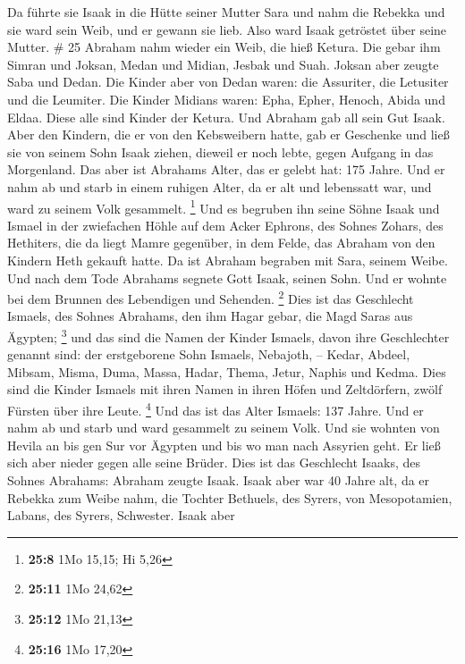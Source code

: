  Da führte sie Isaak in die Hütte seiner Mutter Sara und
nahm die Rebekka und sie ward sein Weib, und er gewann sie lieb. Also
ward Isaak getröstet über seine Mutter. \# 25  Abraham nahm
wieder ein Weib, die hieß Ketura.  Die gebar ihm Simran und
Joksan, Medan und Midian, Jesbak und Suah.  Joksan aber
zeugte Saba und Dedan. Die Kinder aber von Dedan waren: die Assuriter,
die Letusiter und die Leumiter.  Die Kinder Midians waren:
Epha, Epher, Henoch, Abida und Eldaa. Diese alle sind Kinder der Ketura.
 Und Abraham gab all sein Gut Isaak.  Aber den
Kindern, die er von den Kebsweibern hatte, gab er Geschenke und ließ sie
von seinem Sohn Isaak ziehen, dieweil er noch lebte, gegen Aufgang in
das Morgenland.  Das aber ist Abrahams Alter, das er gelebt
hat: 175 Jahre.  Und er nahm ab und starb in einem ruhigen
Alter, da er alt und lebenssatt war, und ward zu seinem Volk gesammelt.
\footnote{\textbf{25:8} 1Mo 15,15; Hi 5,26}  Und es begruben
ihn seine Söhne Isaak und Ismael in der zwiefachen Höhle auf dem Acker
Ephrons, des Sohnes Zohars, des Hethiters, die da liegt Mamre gegenüber,
 in dem Felde, das Abraham von den Kindern Heth gekauft
hatte. Da ist Abraham begraben mit Sara, seinem Weibe.  Und
nach dem Tode Abrahams segnete Gott Isaak, seinen Sohn. Und er wohnte
bei dem Brunnen des Lebendigen und Sehenden. \footnote{\textbf{25:11}
  1Mo 24,62}  Dies ist das Geschlecht Ismaels, des Sohnes
Abrahams, den ihm Hagar gebar, die Magd Saras aus Ägypten; \footnote{\textbf{25:12}
  1Mo 21,13}  und das sind die Namen der Kinder Ismaels,
davon ihre Geschlechter genannt sind: der erstgeborene Sohn Ismaels,
Nebajoth, -- Kedar, Abdeel, Mibsam,  Misma, Duma, Massa,
 Hadar, Thema, Jetur, Naphis und Kedma.  Dies
sind die Kinder Ismaels mit ihren Namen in ihren Höfen und Zeltdörfern,
zwölf Fürsten über ihre Leute. \footnote{\textbf{25:16} 1Mo 17,20}
 Und das ist das Alter Ismaels: 137 Jahre. Und er nahm ab
und starb und ward gesammelt zu seinem Volk.  Und sie
wohnten von Hevila an bis gen Sur vor Ägypten und bis wo man nach
Assyrien geht. Er ließ sich aber nieder gegen alle seine Brüder.
 Dies ist das Geschlecht Isaaks, des Sohnes Abrahams:
Abraham zeugte Isaak.  Isaak aber war 40 Jahre alt, da er
Rebekka zum Weibe nahm, die Tochter Bethuels, des Syrers, von
Mesopotamien, Labans, des Syrers, Schwester.  Isaak aber

